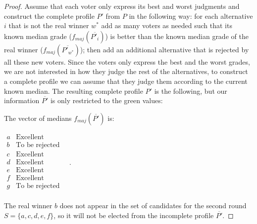 \documentclass[version=3.21, pagesize, twoside=off, bibliography=totoc, DIV=calc, fontsize=12pt, a4paper]{scrartcl}
\begin{document}
\begin{proof}
	Assume that each voter only express its best and worst judgments and construct the complete profile $P'$ from $P$ in the following way: for each alternative $i$ that is not the real winner $w^*$ add as many voters as needed such that its known median grade ($f_{maj}(\overline{P'_i})$) is better than the known median grade of the real winner ($f_{maj}(\overline{P'_{w^*}})$); then add an additional alternative that is rejected by all these new voters. Since the voters only express the best and the worst grades, we are not interested in how they judge the rest of the alternatives, to construct a complete profile we can assume that they judge them according to the current known median. The resulting complete profile $P'$ is the following, but our information $\overline{P'}$ is only restricted to the green values: 
	
	
	The vector of medians $f_{maj}(\overline{P'})$ is:
	\begin{center}
		$
		\begin{array}{cc}
			a &	\text{Excellent} \\
			b &	\text{To be rejected} \\
			c &	\text{Excellent} \\
			d &	\text{Excellent}	\\
			e &	\text{Excellent} \\
			f & \text{Excellent} \\
			g & \text{To be rejected} \\
		\end{array} \quad.
		$
	\end{center}
	The real winner $b$ does not appear in the set of candidates for the second round $S=\{a,c,d,e,f\}$, so it will not be elected from the incomplete profile $\overline{P'}$.
\end{proof}
\end{document}
